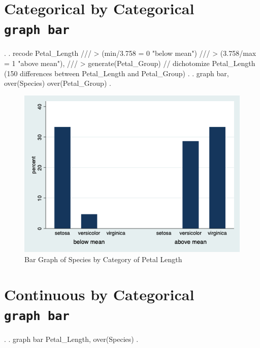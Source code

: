 \documentclass[]{article}
\begin{document}
\hypertarget{categorical-by-categorical-graph-bar}{%
\section{\texorpdfstring{Categorical by Categorical
\texttt{graph\ bar}}{Categorical by Categorical graph bar}}\label{categorical-by-categorical-graph-bar}}

\begin{stlog}
. 
. recode Petal_Length ///
> (min/3.758 = 0 "below mean") ///
> (3.758/max = 1 "above mean"), ///
> generate(Petal_Group) // dichotomize Petal_Length
(150 differences between Petal_Length and Petal_Group)
{\smallskip}
.     
. graph bar, over(Species) over(Petal_Group)
{\smallskip}
. 
\end{stlog}

\begin{stlog}


{\smallskip}

\end{stlog}

\begin{figure}
\centering
\includegraphics[width=0.75\linewidth]{mybargraph2.png}
\caption{Bar Graph of Species by Category of Petal Length}
\end{figure}

\hypertarget{continuous-by-categorical-graph-bar}{%
\section{\texorpdfstring{Continuous by Categorical
\texttt{graph\ bar}}{Continuous by Categorical graph bar}}\label{continuous-by-categorical-graph-bar}}

\begin{stlog}
. 
. graph bar Petal_Length, over(Species)
{\smallskip}
. 
\end{stlog}
\end{document}
